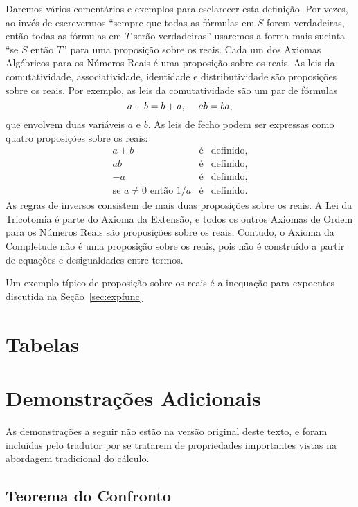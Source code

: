 \documentclass{svmono}
\begin{document}
Daremos vários comentários e exemplos para esclarecer esta definição. Por
vezes, ao invés de escrevermos ``sempre que todas as
fórmulas em $S$ forem verdadeiras, então todas as fórmulas em $T$ serão
verdadeiras'' usaremos a forma mais sucinta ``se $S$ então $T$'' para
uma proposição sobre os reais. Cada um dos Axiomas Algébricos para os Números
Reais é uma proposição sobre os reais. As leis da comutatividade,
associatividade, identidade e distributividade são proposições sobre os
reais. Por exemplo, as leis da comutatividade são um par de fórmulas
\[
a  + b = b + a, \hspace{3ex} ab = ba,
\]
que envolvem duas variáveis $a$ e $b$. As leis de fecho podem ser expressas
como quatro proposições sobre os reais:
\begin{eqnarray*}
a + b & \text{é} & \text{definido}, \\
ab    & \text{é} & \text{definido}, \\
-a    & \text{é} & \text{definido}, \\
\text{se } a \ne 0 \text{ então } 1/a & \text{é} & \text{definido}.
\end{eqnarray*}
As regras de inversos consistem de mais duas proposições sobre os reais. A
Lei da Tricotomia é parte do Axioma da Extensão, e todos os outros
Axiomas de Ordem para os Números Reais são proposições sobre os reais.
Contudo, o Axioma da Completude não é uma proposição sobre os reais,
pois não é construído a partir de equações e desigualdades entre
termos.

Um exemplo típico de proposição sobre os reais é a inequação para expoentes
discutida na Seção~\ref{sec:expfunc}

\appendix

\chapter{Tabelas}

\chapter{Demonstrações Adicionais}

As demonstrações a seguir não estão na versão original deste texto,
e foram incluídas pelo tradutor por se tratarem de propriedades
importantes vistas na abordagem tradicional do cálculo.

\section{Teorema do Confronto}
\end{document}

